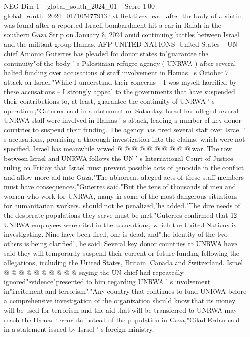 \begin{textsample}{NEG Dim 1 – global\_south\_2024\_01 – Score 1.00 – global\_south\_2024\_01/105477913.txt}  \label{ex:f1_neg_355}
Relatives react after the body of a victim was found after a reported Israeli bombardment hit a car in Rafah in the southern Gaza Strip on January 8, 2024 amid continuing battles between Israel and the militant group Hamas.
AFP UNITED NATIONS, United States -- UN chief Antonio Guterres has pleaded for donor states to"guarantee the continuity"of the body ' s Palestinian refugee agency ( UNRWA ) after several halted funding over accusations of staff involvement in Hamas ' s October 7 attack on Israel."While I understand their concerns -- I was myself horrified by these accusations -- I strongly appeal to the governments that have suspended their contributions to, at least, guarantee the continuity of UNRWA ' s operations,"Guterres said in a statement on Saturday.
Israel has alleged several UNRWA staff were involved in Hamas ' s attack, leading a number of key donor countries to suspend their funding.
The agency has fired several staff over Israel ' s accusations, promising a thorough investigation into the claims, which were not specified.
Israel has meanwhile vowed @ @ @ @ @ @ @ @ @ @ war.
The row between Israel and UNRWA follows the UN ' s International Court of Justice ruling on Friday that Israel must prevent possible acts of genocide in the conflict and allow more aid into Gaza."The abhorrent alleged acts of these staff members must have consequences,"Guterres said."But the tens of thousands of men and women who work for UNRWA, many in some of the most dangerous situations for humanitarian workers, should not be penalized,"he added."The dire needs of the desperate populations they serve must be met."Guterres confirmed that 12 UNRWA employees were cited in the accusations, which the United Nations is investigating.
Nine have been fired, one is dead, and"the identity of the two others is being clarified", he said.
Several key donor countries to UNRWA have said they will temporarily suspend their current or future funding following the allegations, including the United States, Britain, Canada and Switzerland.
Israel @ @ @ @ @ @ @ @ @ @ saying the UN chief had repeatedly ignored"evidence"presented to him regarding UNRWA ' s involvement in"incitement and terrorism"."Any country that continues to fund UNRWA before a comprehensive investigation of the organization should know that its money will be used for terrorism and the aid that will be transferred to UNRWA may reach the Hamas terrorists instead of the population in Gaza,"Gilad Erdan said in a statement issued by Israel ' s foreign ministry.

\end{textsample}

